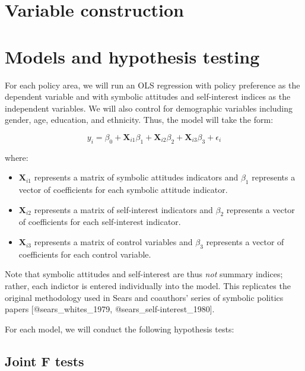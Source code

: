 \documentclass[]{article}
\begin{document}
\section{Variable construction}\label{variable-construction}

\section{Models and hypothesis
testing}\label{models-and-hypothesis-testing}

For each policy area, we will run an OLS regression with policy
preference as the dependent variable and with symbolic attitudes and
self-interest indices as the independent variables. We will also control
for demographic variables including gender, age, education, and
ethnicity. Thus, the model will take the form:

\begin{equation}
y_i = \beta_0 + \textbf{X}_{i1}\beta_1 + \textbf{X}_{i2}\beta_2 +  \textbf{X}_{i3}\beta_3 + \epsilon_i 
\end{equation}

where:

\begin{itemize}
  \item $\textbf{X}_{i1}$ represents a matrix of symbolic attitudes indicators and $\beta_1$ represents a vector of coefficients for each symbolic attitude indicator.
  \item $\textbf{X}_{i2}$ represents a matrix of self-interest indicators and $\beta_2$ represents a vector of coefficients for each self-interest indicator.
  \item $\textbf{X}_{i3}$ represents a matrix of control variables and $\beta_3$ represents a vector of coefficients for each control variable.
\end{itemize}

Note that symbolic attitudes and self-interest are thus \emph{not}
summary indices; rather, each indictor is entered individually into the
model. This replicates the original methodology used in Sears and
coauthors' series of symbolic politics papers {[}@sears\_whites\_1979,
@sears\_self-interest\_1980{]}.

For each model, we will conduct the following hypothesis tests:

\subsection{Joint F tests}\label{joint-f-tests}
\end{document}
